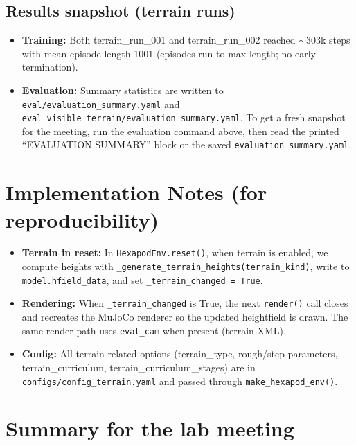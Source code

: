 \documentclass[11pt]{article}
\begin{document}
\subsection{Results snapshot (terrain runs)}

\begin{itemize}
  \item \textbf{Training:} Both terrain\_run\_001 and terrain\_run\_002 reached $\sim$303k steps with mean episode length 1001 (episodes run to max length; no early termination).
  \item \textbf{Evaluation:} Summary statistics are written to \texttt{eval/evaluation\_summary.yaml} and \texttt{eval\_visible\_terrain/evaluation\_summary.yaml}. To get a fresh snapshot for the meeting, run the evaluation command above, then read the printed ``EVALUATION SUMMARY'' block or the saved \texttt{evaluation\_summary.yaml}.
\end{itemize}

\section{Implementation Notes (for reproducibility)}

\begin{itemize}
  \item \textbf{Terrain in reset:} In \texttt{HexapodEnv.reset()}, when terrain is enabled, we compute heights with \texttt{\_generate\_terrain\_heights(terrain\_kind)}, write to \texttt{model.hfield\_data}, and set \texttt{\_terrain\_changed = True}.
  \item \textbf{Rendering:} When \texttt{\_terrain\_changed} is True, the next \texttt{render()} call closes and recreates the MuJoCo renderer so the updated heightfield is drawn. The same render path uses \texttt{eval\_cam} when present (terrain XML).
  \item \textbf{Config:} All terrain-related options (terrain\_type, rough/step parameters, terrain\_curriculum, terrain\_curriculum\_stages) are in \texttt{configs/config\_terrain.yaml} and passed through \texttt{make\_hexapod\_env()}.
\end{itemize}

\section{Summary for the lab meeting}
\end{document}
